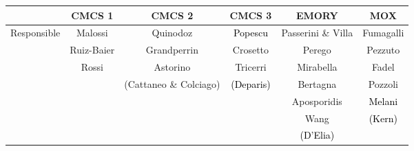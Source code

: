 \documentclass[10p]{article}
\newcommand{\newparts}[1]{\textcolor{black}{#1}}
\newcommand{\newpartsVC}[1]{\textcolor{black}{#1}}
\theoremstyle{definition}
\begin{document}
\begin{table}[!h]
\begin{tabular}{c|c|c|c|c|c}
            & \textbf{CMCS 1} & \textbf{CMCS 2}        & \textbf{CMCS 3} & \textbf{EMORY} & \textbf{MOX}\\
\hline
Responsible & Malossi         & Quinodoz               & \newparts{Popescu}   & Passerini \& Villa & Fumagalli\\
\hline
            & Ruiz-Baier      & Grandperrin            & Crosetto  & Perego            & Pezzuto\\
            & Rossi           & Astorino               & Tricerri  & Mirabella         & Fadel\\ 
            &                 & (Cattaneo \& Colciago) & \newparts{(Deparis)} & Bertagna           & Pozzoli\\
            &                 &                        &           & Aposporidis        & \newpartsVC{Melani}\\
            &                 &                        &           & Wang               & \newpartsVC{(Kern)}\\
            &                 &                        &           & \newpartsVC{(D'Elia)} & 
\end{tabular}
\end{table}

\newpage
\end{document}
